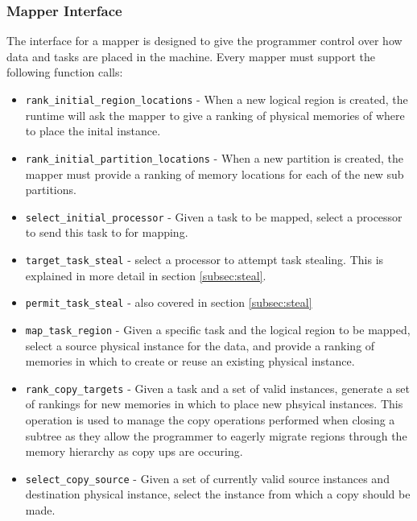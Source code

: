 \subsubsection{Mapper Interface}
\label{subsec:mapinter}
The interface for a mapper is designed to give the programmer control over how data and tasks
are placed in the machine.  Every mapper must support the following function calls:

\begin{itemize}
\item {\tt rank\_initial\_region\_locations} - When a new logical region is created, the runtime
will ask the mapper to give a ranking of physical memories of where to place the inital instance.

\item {\tt rank\_initial\_partition\_locations} - When a new partition is created, the mapper
must provide a ranking of memory locations for each of the new sub partitions.

\item {\tt select\_initial\_processor} - Given a task to be mapped, select a processor to
send this task to for mapping.  

\item {\tt target\_task\_steal} - select a processor to attempt task stealing.  This is explained
in more detail in section \ref{subsec:steal}.  

\item {\tt permit\_task\_steal} - also covered in section \ref{subsec:steal}

\item {\tt map\_task\_region} - Given a specific task and the logical region to be mapped, select
a source physical instance for the data, and provide a ranking of memories in which to create
or reuse an existing physical instance.

\item {\tt rank\_copy\_targets} - Given a task and a set of valid instances, generate a set of
rankings for new memories in which to place new phsyical instances.  This operation is used to
manage the copy operations performed when closing a subtree as they allow the programmer to
eagerly migrate regions through the memory hierarchy as copy ups are occuring.

\item {\tt select\_copy\_source} - Given a set of currently valid source instances and destination
physical instance, select the instance from which a copy should be made.
\end{itemize}

